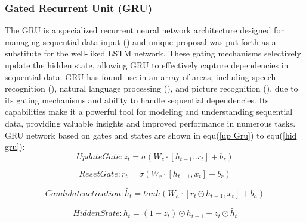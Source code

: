 \documentclass[a4paper,fleqn]{cas-dc}
\begin{document}
\subsubsection{Gated Recurrent Unit (GRU)}
The GRU is a specialized recurrent neural network architecture designed for managing sequential data input  (\cite{chung2014empirical}) and unique proposal was put forth as a substitute for the well-liked LSTM network. These gating mechanisms selectively update the hidden state, allowing GRU to effectively capture dependencies in sequential data. GRU has found use in an array of areas, including speech recognition (\cite{shewalkar2019performance,yuan2018auxiliary}), natural language processing (\cite{cascianelli2018full,wang2020feature}), and picture recognition (\cite{subramanian2022integrated}), due to its gating mechanisms and ability to handle sequential dependencies. Its capabilities make it a powerful tool for modeling and understanding sequential data, providing valuable insights and improved performance in numerous tasks. GRU network based on gates and states are shown in equ(\ref{up Gru}) to equ(\ref{hid gru}):\\

 
\begin{equation} \label{up Gru}
  Update Gate : z_t= \sigma(W_{z}\cdot \left[ h_{t-1},x_t \right]+b_z )
\end{equation}

\begin{equation}\label{r gru}
  Reset Gate : r_t=\sigma (W_{r}\cdot \left[ h_{t-1},x_t \right]+b_r )
\end{equation}

\begin{equation} \label{can gru}
  Candidate activation : \tilde{h_t}=tanh(W_h \cdot \left[ r_t \odot h_{t-1},x_t \right]+b_h)
\end{equation}

\begin{equation} \label{hid gru}
  Hidden State :  h_t=(1-z_t) \odot h_{t-1}+z_t \odot \tilde{h_t}
\end{equation}
\end{document}
